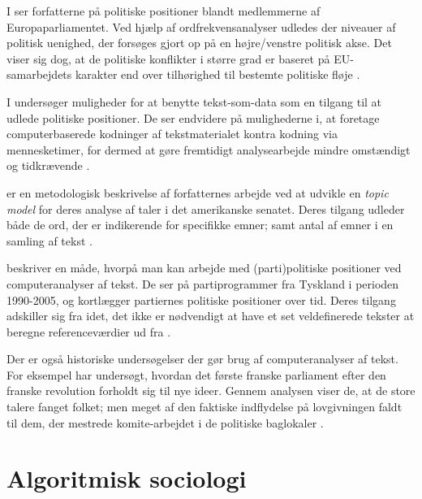 I  ser forfatterne på politiske positioner blandt medlemmerne af Europaparliamentet.
Ved hjælp af ordfrekvensanalyser udledes der niveauer af politisk uenighed, der forsøges gjort op på en højre/venstre politisk akse.
Det viser sig dog, at de politiske konflikter i større grad er baseret på EU-samarbejdets karakter end over tilhørighed til bestemte politiske fløje \autocite{prokschPositionTakingEuropean2010}.

I  undersøger \citeauthor{laverExtractingPolicyPositions2003} muligheder for at benytte tekst-som-data som en tilgang til at udlede politiske positioner.
De ser endvidere på mulighederne i, at foretage computerbaserede kodninger af tekstmaterialet kontra kodning via mennesketimer, for dermed at gøre fremtidigt analysearbejde mindre omstændigt og tidkrævende \autocite{laverExtractingPolicyPositions2003}.

 er en metodologisk beskrivelse af forfatternes arbejde ved at udvikle en \textit{topic model} for deres analyse af taler i det amerikanske senatet.
Deres tilgang udleder både de ord, der er indikerende for specifikke emner; samt antal af emner i en samling af tekst \autocite{quinnHowAnalyzePolitical2010}.

\citeauthor{slapinScalingModelEstimating2008} beskriver en måde, hvorpå man kan arbejde med (parti)politiske positioner ved computeranalyser af tekst.
De ser på partiprogrammer fra Tyskland i perioden 1990-2005, og kortlægger partiernes politiske positioner over tid.
Deres tilgang adskiller sig fra \citeauthor{laverExtractingPolicyPositions2003} idet, det ikke er nødvendigt at have et set veldefinerede tekster at beregne referenceværdier ud fra \autocite{slapinScalingModelEstimating2008}.

Der er også historiske undersøgelser der gør brug af computeranalyser af tekst.
For eksempel har \citeauthor{barronIndividualsInstitutionsInnovation2018} undersøgt, hvordan det første franske parliament efter den franske revolution forholdt sig til nye ideer.
Gennem analysen viser de, at de store talere fanget folket; men meget af den faktiske indflydelse på lovgivningen faldt til dem, der mestrede komite-arbejdet i de politiske baglokaler \autocite{barronIndividualsInstitutionsInnovation2018}. 

\section{Algoritmisk sociologi}\label{sec:review-compsoc}

